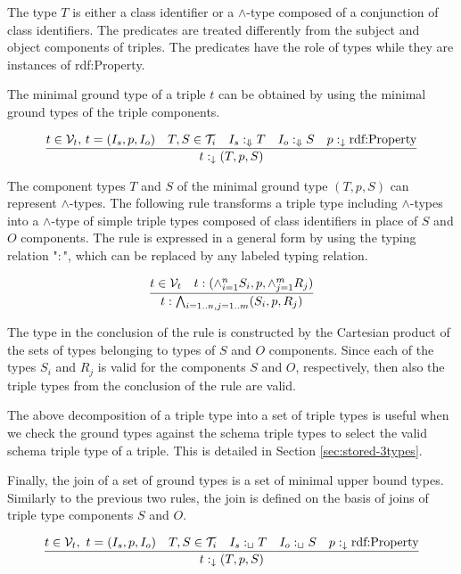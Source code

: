 \documentclass[runningheads]{llncs}
\newcommand{\darr}{\downarrow}
\newcommand{\Darr}{\Downarrow}
\newcommand{\V}{{\cal V}}
\newcommand{\T}{{\cal T}}
\begin{document}
The type $T$ is either a class identifier or a $\land$-type composed
of a conjunction of class identifiers. The predicates are treated
differently from the subject and object components of triples. The
predicates have the role of types while they are instances of
rdf:Property.

The minimal ground type of a triple $t$ can be obtained by using the
minimal ground types of the triple components. 

\begin{equation}
\label{rul:3-min-ground}
\dfrac{t\in\V_t,\, t=(I_s,p,I_o)\quad T,S\in\T_i\quad I_s:_\Darr\/T\quad I_o:_\Darr\/S\quad p:_\darr\text{rdf:Property}}
      {t:_\darr\/(T,p,S)}
\end{equation}

The component types $T$ and $S$ of the minimal ground type
$(T,p,S)$ can represent $\land$-types. The following rule transforms
a triple type including $\land$-types into a $\land$-type of simple
triple types composed of class identifiers in place of $S$ and $O$
components. The rule is expressed in a general form by using the
typing relation "$:$", which can be replaced by any labeled typing
relation.

\begin{equation}
\label{rul:3-land-transform}
\dfrac{t\in\V_t\quad t:(\land_{i=1}^n\/S_i,p,\land_{j=1}^mR_j)}
      {t:\bigwedge_{i=1..n, j=1..m}(S_i,p,R_j)}
\end{equation}

The type in the conclusion of the rule is constructed by the Cartesian
product of the sets of types belonging to types of $S$ and $O$
components. Since each of the types $S_i$ and $R_j$ is valid for the
components $S$ and $O$, respectively, then also the triple types from
the conclusion of the rule are valid.

The above decomposition of a triple type into a set of triple types is
useful when we check the ground types against the schema triple types
to select the valid schema triple type of a triple. This is detailed in
Section \ref{sec:stored-3types}.

Finally, the join of a set of ground types is a set of minimal upper
bound types. Similarly to the previous two rules, the join is defined
on the basis of joins of triple type components $S$ and $O$.

\begin{equation}
\label{rul:3-join}
\dfrac{t\in\V_t,\ t=(I_s,p,I_o)\quad T,S\in\T_i\quad I_s:_\sqcup\/T\quad I_o:_\sqcup\/S\quad p:_\darr\text{rdf:Property}}
      {t:_\darr\/(T,p,S)}
\end{equation}
\end{document}

